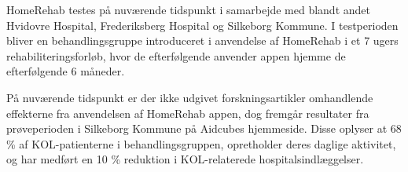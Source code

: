 HomeRehab testes på nuværende tidspunkt i samarbejde med blandt andet Hvidovre Hospital, Frederiksberg Hospital og Silkeborg Kommune. 
I testperioden bliver en behandlingsgruppe introduceret i anvendelse af HomeRehab i et 7 ugers rehabiliteringsforløb, hvor de efterfølgende anvender appen hjemme de efterfølgende 6 måneder. \cite{HealthcareDenmark2017}

På nuværende tidspunkt er der ikke udgivet forskningsartikler omhandlende effekterne fra anvendelsen af HomeRehab appen, dog fremgår resultater fra prøveperioden i Silkeborg Kommune på Aidcubes hjemmeside. Disse oplyser at 68 \% af KOL-patienterne i behandlingsgruppen, opretholder deres daglige aktivitet, og har medført en 10 \% reduktion i KOL-relaterede hospitalsindlæggelser. \cite{AidCube2017}

